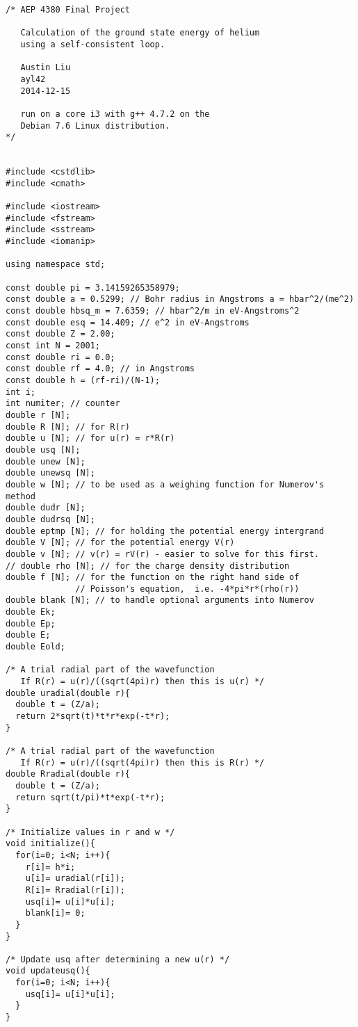 \documentclass[11pt,letterpaper]{article}
\begin{document}
\begin{verbatim}
/* AEP 4380 Final Project

   Calculation of the ground state energy of helium
   using a self-consistent loop.

   Austin Liu
   ayl42
   2014-12-15

   run on a core i3 with g++ 4.7.2 on the 
   Debian 7.6 Linux distribution.
*/


#include <cstdlib>
#include <cmath>

#include <iostream>
#include <fstream>
#include <sstream>
#include <iomanip>

using namespace std;

const double pi = 3.14159265358979;
const double a = 0.5299; // Bohr radius in Angstroms a = hbar^2/(me^2)
const double hbsq_m = 7.6359; // hbar^2/m in eV-Angstroms^2
const double esq = 14.409; // e^2 in eV-Angstroms
const double Z = 2.00;
const int N = 2001;
const double ri = 0.0;
const double rf = 4.0; // in Angstroms
const double h = (rf-ri)/(N-1);
int i;
int numiter; // counter
double r [N];
double R [N]; // for R(r)
double u [N]; // for u(r) = r*R(r)
double usq [N];
double unew [N];
double unewsq [N];
double w [N]; // to be used as a weighing function for Numerov's method
double dudr [N];
double dudrsq [N];
double eptmp [N]; // for holding the potential energy intergrand
double V [N]; // for the potential energy V(r)
double v [N]; // v(r) = rV(r) - easier to solve for this first.
// double rho [N]; // for the charge density distribution
double f [N]; // for the function on the right hand side of
              // Poisson's equation,  i.e. -4*pi*r*(rho(r))
double blank [N]; // to handle optional arguments into Numerov
double Ek;
double Ep;
double E;
double Eold;
  
/* A trial radial part of the wavefunction
   If R(r) = u(r)/((sqrt(4pi)r) then this is u(r) */
double uradial(double r){
  double t = (Z/a);
  return 2*sqrt(t)*t*r*exp(-t*r);  
}

/* A trial radial part of the wavefunction
   If R(r) = u(r)/((sqrt(4pi)r) then this is R(r) */
double Rradial(double r){
  double t = (Z/a);
  return sqrt(t/pi)*t*exp(-t*r);  
}

/* Initialize values in r and w */
void initialize(){
  for(i=0; i<N; i++){
    r[i]= h*i;
    u[i]= uradial(r[i]);
    R[i]= Rradial(r[i]);
    usq[i]= u[i]*u[i];
    blank[i]= 0;
  }  
}

/* Update usq after determining a new u(r) */
void updateusq(){
  for(i=0; i<N; i++){
    usq[i]= u[i]*u[i];
  }  
}


\end{verbatim}
\end{document}
